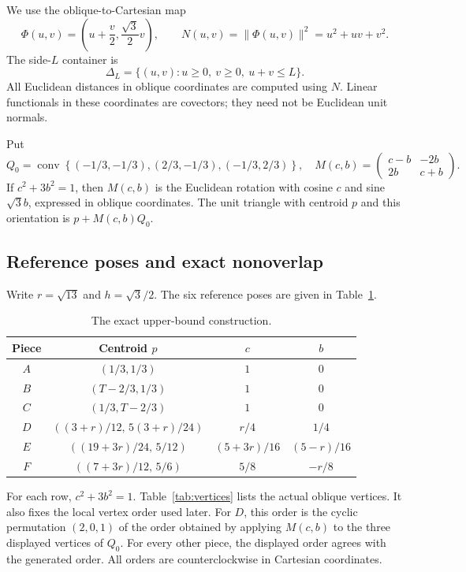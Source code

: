 \documentclass[11pt]{article}
\begin{document}
We use the oblique-to-Cartesian map
\[
 \Phi(u,v)=\left(u+\frac v2,\frac{\sqrt3}2v\right),
 \qquad N(u,v)=\|\Phi(u,v)\|^2=u^2+uv+v^2.
\]
The side-$L$ container is
\[
 \Delta_L=\{(u,v):u\ge0,\ v\ge0,\ u+v\le L\}.
\]
All Euclidean distances in oblique coordinates are computed using $N$. Linear functionals in these coordinates are covectors; they need not be Euclidean unit normals.

Put
\[
 Q_0=\operatorname{conv}\left\{
 (-1/3,-1/3),(2/3,-1/3),(-1/3,2/3)\right\},
\quad
 M(c,b)=\begin{pmatrix}c-b&-2b\\2b&c+b\end{pmatrix}.
\]
If $c^2+3b^2=1$, then $M(c,b)$ is the Euclidean rotation with cosine $c$ and sine $\sqrt3 b$, expressed in oblique coordinates. The unit triangle with centroid $p$ and this orientation is $p+M(c,b)Q_0$.

\subsection{Reference poses and exact nonoverlap}

Write $r=\sqrt{13}$ and $h=\sqrt3/2$. The six reference poses are given in Table~\ref{tab:poses}.
\begin{table}[htbp]
\centering
\small
\begin{tabular}{c c c c}
\hline
Piece & Centroid $p$ & $c$ & $b$\\\hline
$A$ & $(1/3,1/3)$ & $1$ & $0$\\
$B$ & $(T-2/3,1/3)$ & $1$ & $0$\\
$C$ & $(1/3,T-2/3)$ & $1$ & $0$\\
$D$ & $((3+r)/12,\,5(3+r)/24)$ & $r/4$ & $1/4$\\
$E$ & $((19+3r)/24,\,5/12)$ & $(5+3r)/16$ & $(5-r)/16$\\
$F$ & $((7+3r)/12,\,5/6)$ & $5/8$ & $-r/8$\\\hline
\end{tabular}
\caption{The exact upper-bound construction.}\label{tab:poses}
\end{table}

For each row, $c^2+3b^2=1$. Table~\ref{tab:vertices} lists the actual oblique vertices. It also fixes the local vertex order used later. For $D$, this order is the cyclic permutation $(2,0,1)$ of the order obtained by applying $M(c,b)$ to the three displayed vertices of $Q_0$. For every other piece, the displayed order agrees with the generated order. All orders are counterclockwise in Cartesian coordinates.
\end{document}
